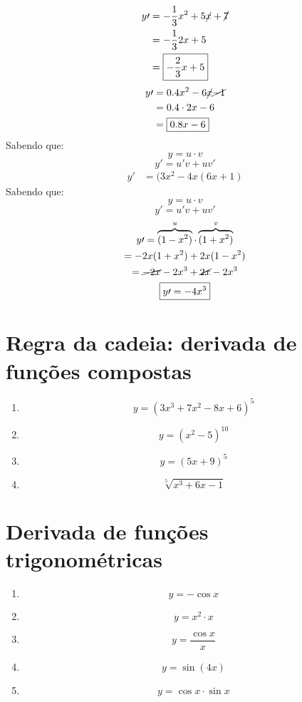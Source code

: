 \documentclass{jhwhw}
\begin{document}
\begin{align*}
    y\prime & = -\frac{1}{3} x^2 + 5\cancel{x} + \cancel{7} \\
            & = -\frac{1}{3} 2x + 5                         \\
            & = \boxed{-\frac{2}{3} x + 5}
\end{align*}
\begin{align*}
    y\prime & = 0.4 x^2 -6\cancel{x} \cancel{-1} \\
            & = 0.4\cdot2x -6                    \\
            & = \boxed{0.8x - 6}
\end{align*}
Sabendo que:
\[
    y = u \cdot v
\]
\[
    y\prime = u\prime v + u v\prime
\]
\begin{align*}
    y\prime & = (3x^2 - 4x(6x+1)
\end{align*}
Sabendo que: \[
    y = u \cdot v\]\[
    y\prime = u\prime v + u v\prime
\]
\begin{multline*}
    y\prime = \overbrace{(1-x^2)}^{u} \cdot \overbrace{(1+x^2)}^{v} \\
    = -2x(1+x^2) + 2x(1-x^2) \\
    = \cancel{-2x} - 2x^3 + \cancel{2x} - 2x^3 \\
    \boxed{y\prime= -4x^3}
\end{multline*}
\newpage
\reset
\chapter{Regra da cadeia: derivada de funções compostas}
\begin{enumerate}
    \item $$y = (3x^3 + 7x^2 - 8x + 6)^5$$
    \item $$y = (x^2 -5)^10$$
    \item $$y = (5x+9)^5$$
    \item $$\sqrt[5]{x^3 + 6x - 1}$$
\end{enumerate}
\newpage
\reset
\chapter{Derivada de funções trigonométricas}
\begin{enumerate}
    \item $$y = -\cos x$$
    \item $$y = x^2 \cdot x$$
    \item $$y = \frac{\cos x}{x}$$
    \item $$y = \sin (4x)$$
    \item $$y = \cos x \cdot \sin x$$
\end{enumerate}
\newpage
\reset
\end{document}
